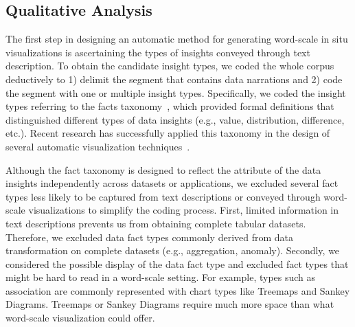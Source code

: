 \subsection{Qualitative Analysis}
The first step in designing an automatic method for generating word-scale in situ visualizations is ascertaining the types of insights conveyed through text description. To obtain the candidate insight types, we coded the whole corpus deductively to 1) delimit the segment that contains data narrations and 2) code the segment with one or multiple insight types. Specifically, we coded the insight types referring to the facts taxonomy~\cite{chen2009effective}, which provided formal definitions that distinguished different types of data insights (e.g., value, distribution, difference, etc.). Recent research has successfully applied this taxonomy in the design of several automatic visualization techniques~\cite{wang2020datashot, shi2021calliope, chen2024chart2vec}.

Although the fact taxonomy is designed to reflect the attribute of the data insights independently across datasets or applications, we excluded several fact types less likely to be captured from text descriptions or conveyed through word-scale visualizations to simplify the coding process. First, limited information in text descriptions prevents us from obtaining complete tabular datasets. Therefore, we excluded data fact types commonly derived from data transformation on complete datasets (e.g., aggregation, anomaly). Secondly, we considered the possible display of the data fact type and excluded fact types that might be hard to read in a word-scale setting. For example, types such as association are commonly represented with chart types like Treemaps and Sankey Diagrams. %
Treemaps or Sankey Diagrams require much more space than what word-scale visualization could offer.

